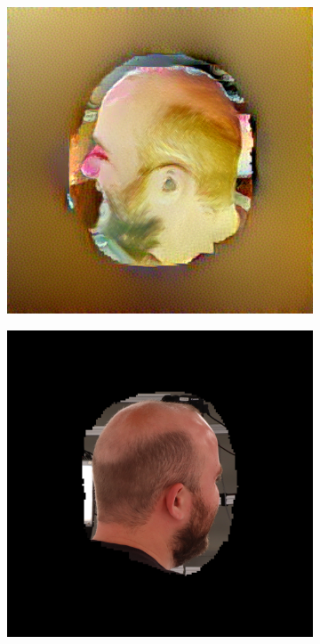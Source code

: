 \begin{figure}
\begin{subfigure}{0.22\linewidth}
        \includegraphics[width=\textwidth]{Figures/failed/stross/textures/59/stylized_view_8-5-3-2_123851_842.png}
	\end{subfigure}
    \begin{subfigure}{0.22\linewidth}
        \includegraphics[width=\textwidth]{Figures/failed/stross/textures/masked/masked_head_8-C-5-1_123851_737.png}

\end{subfigure}
\end{figure}
